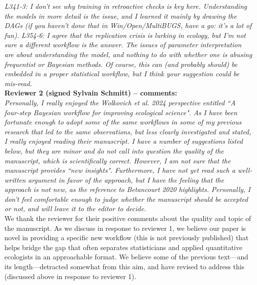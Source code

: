 \documentclass[11pt,a4paper]{article}
\begin{document}
\emph{L341-3: I don't see why training in retroactive checks is key here. Understanding the models in more detail is the issue, and I learned it mainly by drawing the DAGs (if you haven't done that in Win/Open/MultiBUGS, have a go: it's a lot of fun).}
\emph{L354-6: I agree that the replication crisis is lurking in ecology, but I'm not sure a different workflow is the answer. The issues of parameter interpretation are about understanding the model, and nothing to do with whether one is abusing frequentist or Bayesian methods. Of course, this can (and probably should) be embedded in a proper statistical workflow, but I think your suggestion could be mis-read.}\\

{\bf Reviewer 2 (signed Sylvain Schmitt) -- comments:} \\


\emph{Personally, I really enjoyed the Wolkovich et al. 2024 perspective entitled ``A four-step Bayesian workflow for improving ecological science". As I have been fortunate enough to adopt some of the same workflows in some of my previous research that led to the same observations, but less clearly investigated and stated, I really enjoyed reading their manuscript. I have a number of suggestions listed below, but they are minor and do not call into question the quality of the manuscript, which is scientifically correct. However, I am not sure that the manuscript provides ``new insights". Furthermore, I have not yet read such a well-written argument in favor of the approach, but I have the feeling that the approach is not new, as the reference to Betancourt 2020 highlights. Personally, I don't feel comfortable enough to judge whether the manuscript should be accepted or not, and will leave it to the editor to decide.}\\

We thank the reviewer for their positive comments about the quality and topic of the manuscript. As we discuss in response to reviewer 1, we believe our paper is novel in providing a specific new workflow (this is not previously published) that helps bridge the gap that often separates statisticians and applied quantitative ecologists in an approachable format. We believe some of the previous text---and its length---detracted somewhat from this aim, and have revised to address this (discussed above in response to reviewer 1). \\
\end{document}
